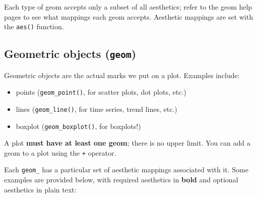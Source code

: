 \documentclass[]{book}
\providecommand{\tightlist}{%
  \setlength{\itemsep}{0pt}\setlength{\parskip}{0pt}}
\begin{document}
Each type of geom accepts only a subset of all aesthetics; refer to the
geom help pages to see what mappings each geom accepts. Aesthetic
mappings are set with the \texttt{aes()} function.

\subsection{\texorpdfstring{Geometric objects
(\texttt{geom})}{Geometric objects (geom)}}\label{geometric-objects-geom}

Geometric objects are the actual marks we put on a plot. Examples
include:

\begin{itemize}
\tightlist
\item
  points (\texttt{geom\_point()}, for scatter plots, dot plots, etc.)
\item
  lines (\texttt{geom\_line()}, for time series, trend lines, etc.)
\item
  boxplot (\texttt{geom\_boxplot()}, for boxplots!)
\end{itemize}

A plot \textbf{must have at least one geom}; there is no upper limit.
You can add a geom to a plot using the \texttt{+} operator.

Each \texttt{geom\_} has a particular set of aesthetic mappings
associated with it. Some examples are provided below, with required
aesthetics in \textbf{bold} and optional aesthetics in plain text:
\end{document}
